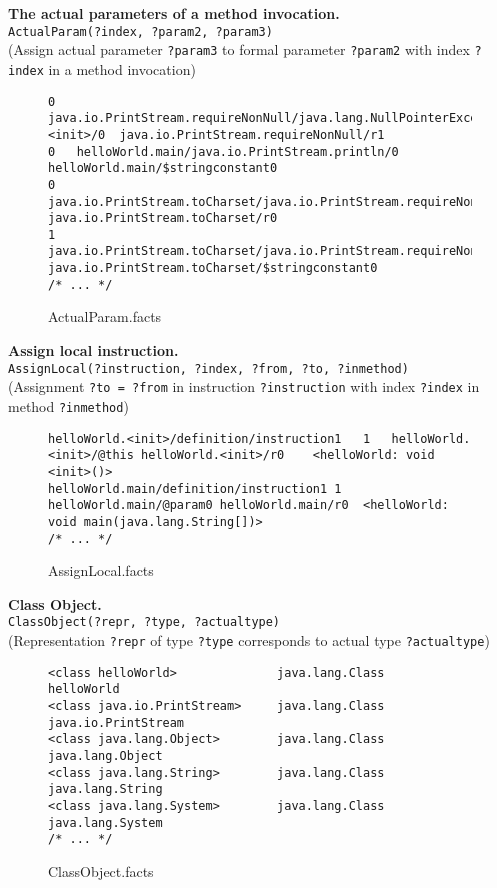 \documentclass{dithesis}
\begin{document}
        \textbf{The actual parameters of a method invocation.}\\
        \texttt{ActualParam(?index, ?param2, ?param3)}\\
        (Assign actual parameter \texttt{?param3} to formal parameter \texttt{?param2} with index \texttt{?index} in a method invocation)
    	\begin{figure}[H]
\begin{lstlisting}
0   java.io.PrintStream.requireNonNull/java.lang.NullPointerException.<init>/0  java.io.PrintStream.requireNonNull/r1
0   helloWorld.main/java.io.PrintStream.println/0   helloWorld.main/$stringconstant0
0   java.io.PrintStream.toCharset/java.io.PrintStream.requireNonNull/0  java.io.PrintStream.toCharset/r0
1   java.io.PrintStream.toCharset/java.io.PrintStream.requireNonNull/0  java.io.PrintStream.toCharset/$stringconstant0
/* ... */
\end{lstlisting}
\caption{ActualParam.facts}
        \end{figure}


        \textbf{Assign local instruction.}\\
        \texttt{AssignLocal(?instruction, ?index, ?from, ?to, ?inmethod)}\\
        (Assignment \texttt{?to = ?from} in instruction \texttt{?instruction} with index \texttt{?index} in method \texttt{?inmethod})
        \begin{figure}[H]
\begin{lstlisting}
helloWorld.<init>/definition/instruction1   1   helloWorld.<init>/@this helloWorld.<init>/r0    <helloWorld: void <init>()>
helloWorld.main/definition/instruction1 1   helloWorld.main/@param0 helloWorld.main/r0  <helloWorld: void main(java.lang.String[])>
/* ... */
\end{lstlisting}
\caption{AssignLocal.facts}
        \end{figure}


        \textbf{Class Object.}\\
        \texttt{ClassObject(?repr, ?type, ?actualtype)}\\
        (Representation \texttt{?repr} of type \texttt{?type} corresponds to actual type \texttt{?actualtype})
        \begin{figure}[H]
\begin{lstlisting}
<class helloWorld>              java.lang.Class     helloWorld
<class java.io.PrintStream>     java.lang.Class     java.io.PrintStream
<class java.lang.Object>        java.lang.Class     java.lang.Object
<class java.lang.String>        java.lang.Class     java.lang.String
<class java.lang.System>        java.lang.Class     java.lang.System
/* ... */
\end{lstlisting}
\caption{ClassObject.facts}
        \end{figure}
\end{document}
